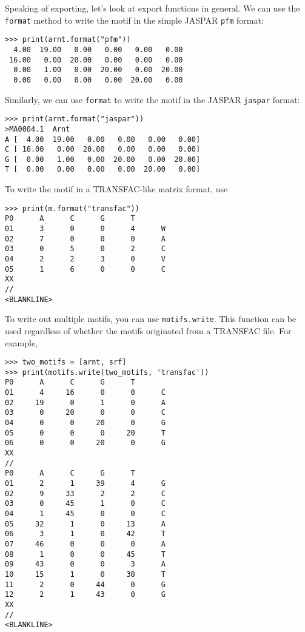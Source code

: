 \documentclass{report}
\begin{document}
Speaking of exporting, let's look at export functions in general.
We can use the \verb+format+ method to write the motif in the simple JASPAR \verb+pfm+ format:
\begin{verbatim}
>>> print(arnt.format("pfm"))
  4.00  19.00   0.00   0.00   0.00   0.00
 16.00   0.00  20.00   0.00   0.00   0.00
  0.00   1.00   0.00  20.00   0.00  20.00
  0.00   0.00   0.00   0.00  20.00   0.00
\end{verbatim}
Similarly, we can use \verb+format+ to write the motif in the JASPAR \verb+jaspar+ format:
\begin{verbatim}
>>> print(arnt.format("jaspar"))
>MA0004.1  Arnt
A [  4.00  19.00   0.00   0.00   0.00   0.00]
C [ 16.00   0.00  20.00   0.00   0.00   0.00]
G [  0.00   1.00   0.00  20.00   0.00  20.00]
T [  0.00   0.00   0.00   0.00  20.00   0.00]
\end{verbatim}

To write the motif in a TRANSFAC-like matrix format, use
\begin{verbatim}
>>> print(m.format("transfac"))
P0      A      C      G      T
01      3      0      0      4      W
02      7      0      0      0      A
03      0      5      0      2      C
04      2      2      3      0      V
05      1      6      0      0      C
XX
//
<BLANKLINE>
\end{verbatim}

To write out multiple motifs, you can use \verb+motifs.write+.
This function can be used regardless of whether the motifs originated from a TRANSFAC file. For example,
\begin{verbatim}
>>> two_motifs = [arnt, srf]
>>> print(motifs.write(two_motifs, 'transfac'))
P0      A      C      G      T
01      4     16      0      0      C
02     19      0      1      0      A
03      0     20      0      0      C
04      0      0     20      0      G
05      0      0      0     20      T
06      0      0     20      0      G
XX
//
P0      A      C      G      T
01      2      1     39      4      G
02      9     33      2      2      C
03      0     45      1      0      C
04      1     45      0      0      C
05     32      1      0     13      A
06      3      1      0     42      T
07     46      0      0      0      A
08      1      0      0     45      T
09     43      0      0      3      A
10     15      1      0     30      T
11      2      0     44      0      G
12      2      1     43      0      G
XX
//
<BLANKLINE>
\end{verbatim}
\end{document}
